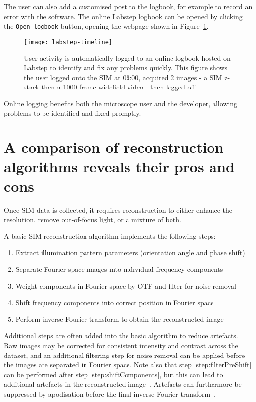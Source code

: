 The user can also add a customised post to the logbook, for example to record an error with the software. 
The online Labstep logbook can be opened by clicking the \texttt{Open logbook} button, opening the webpage shown in Figure~\ref{fig:labstepTimeline}. 

\begin{figure}[htbp!]
\centering
\texttt{[image: labstep-timeline]}
\caption[LAG SIM: Logging user activity with Labstep allows any problems to be identified and fixed quickly]{User activity is automatically logged to an online logbook hosted on Labstep to identify and fix any problems quickly. This figure shows the user logged onto the SIM at 09:00, acquired 2 images - a SIM z-stack then a 1000-frame widefield video - then logged off.}
\label{fig:labstepTimeline}
\end{figure}

Online logging benefits both the microscope user and the developer, allowing problems to be identified and fixed promptly. 


\section{A comparison of reconstruction algorithms reveals their pros and cons} \label{sec:recon}
Once SIM data is collected, it requires reconstruction to either enhance the resolution, remove out-of-focus light, or a mixture of both.

A basic SIM reconstruction algorithm implements the following steps:
\begin{enumerate}
	\item Extract illumination pattern parameters (orientation angle and phase shift)
	\item Separate Fourier space images into individual frequency components
	\item \label{step:filterPreShift}Weight components in Fourier space by OTF and filter for noise removal
	\item \label{step:shiftComponents}Shift frequency components into correct position in Fourier space
	\item Perform inverse Fourier transform to obtain the reconstructed image
\end{enumerate}

Additional steps are often added into the basic algorithm to reduce artefacts. 
Raw images may be corrected for consistent intensity and contrast across the dataset, and an additional filtering step for noise removal can be applied before the images are separated in Fourier space. 
Note also that step \ref{step:filterPreShift} can be performed after step \ref{step:shiftComponents}, but this can lead to additional artefacts in the reconstructed image~\cite{gustafsson2008three}. 
Artefacts can furthermore be suppressed by apodisation before the final inverse Fourier transform~\cite{gustafsson2008three}. 

